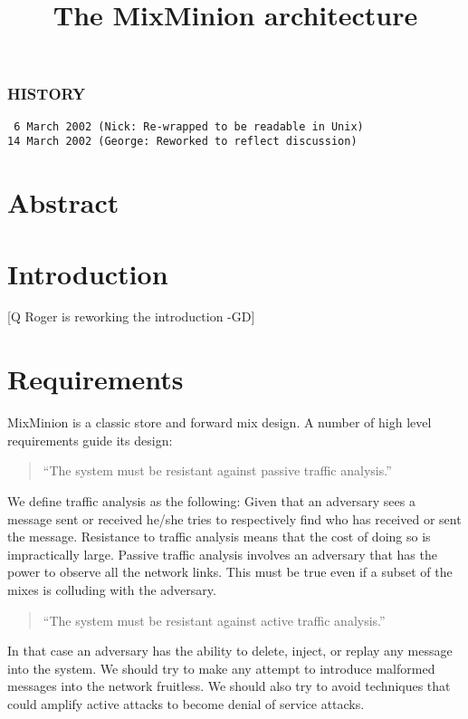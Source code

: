 \documentclass{article}
\begin{document}
\title{The MixMinion architecture}
\maketitle
\subsubsection{HISTORY}
\begin{verbatim}
 6 March 2002 (Nick: Re-wrapped to be readable in Unix)
14 March 2002 (George: Reworked to reflect discussion)
\end{verbatim}

\section{Abstract}
\section{Introduction}

[Q Roger is reworking the introduction -GD]

\section{Requirements}

MixMinion is a classic store and forward mix design. A number of high
level requirements guide its design:

\begin{quote}
     ``The system must be resistant against passive traffic analysis.''
\end{quote}

We define traffic analysis as the following: Given that an adversary
sees a message sent or received he/she tries to respectively find who
has received or sent the message. Resistance to traffic analysis means
that the cost of doing so is impractically large. Passive traffic
analysis involves an adversary that has the power to observe all the
network links. This must be true even if a subset of the mixes is
colluding with the adversary.

\begin{quote}
     ``The system must be resistant against active traffic analysis.''
\end{quote}

In that case an adversary has the ability to delete, inject, or replay 
any message into the system. We should try to make any attempt to
introduce malformed messages into the network fruitless. We should
also try to avoid techniques that could amplify active attacks to
become denial of service attacks.
\end{document}
